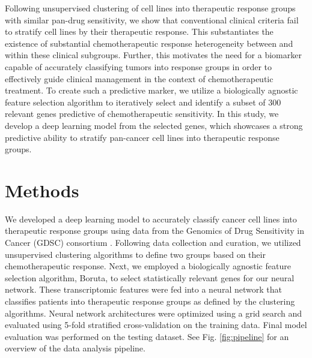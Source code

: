 \documentclass[10pt, letterpaper, twocolumn]{article}
\begin{document}
Following unsupervised clustering of cell lines into therapeutic response groups with similar pan-drug sensitivity, we show that conventional clinical criteria fail to stratify cell lines by their therapeutic response. This substantiates the existence of substantial chemotherapeutic response heterogeneity between and within these clinical subgroups. Further, this motivates the need for a biomarker capable of accurately classifying tumors into response groups in order to effectively guide clinical management in the context of chemotherapeutic treatment. To create such a predictive marker, we utilize a biologically agnostic feature selection algorithm to iteratively select and identify a subset of 300 relevant genes predictive of chemotherapeutic sensitivity. In this study, we develop a deep learning model from the selected genes, which showcases a strong predictive ability to stratify pan-cancer cell lines into therapeutic response groups.


\section{Methods}
We developed a deep learning model to accurately classify cancer cell lines into therapeutic response groups using data from the Genomics of Drug Sensitivity in Cancer (GDSC) consortium \cite{gdsc}. Following data collection and curation, we utilized unsupervised clustering algorithms to define two groups based on their chemotherapeutic response. Next, we employed a biologically agnostic feature selection algorithm, Boruta, to select statistically relevant genes for our neural network. These transcriptomic features were fed into a neural network that classifies patients into therapeutic response groups as defined by the clustering algorithms. Neural network architectures were optimized using a grid search and evaluated using 5-fold stratified cross-validation on the training data. Final model evaluation was performed on the testing dataset. See Fig. \ref{fig:pipeline} for an overview of the data analysis pipeline. \vspace{1em}
\end{document}
